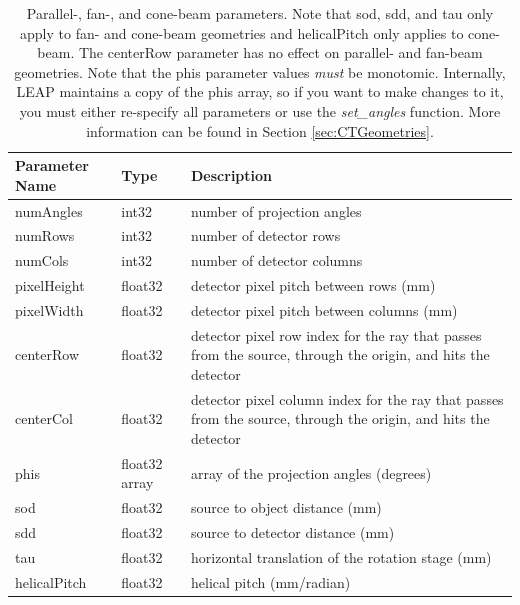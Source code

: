 \documentclass[11pt]{article}
\begin{document}
\begin{table}[h!]
\caption{Parallel-, fan-, and cone-beam parameters.  Note that sod, sdd, and tau only apply to fan- and cone-beam geometries and helicalPitch only applies to cone-beam. The centerRow parameter has no effect on parallel- and fan-beam geometries.  Note that the phis parameter values \textit{must} be monotomic.  Internally, LEAP maintains a copy of the phis array, so if you want to make changes to it, you must either re-specify all parameters or use the \textit{set\_angles} function.  More information can be found in Section \ref{sec:CTGeometries}.} \label{tab:stdGeometryParameters}
\begin{tabular}{l|l|p{9cm}}
Parameter Name & Type & Description \\
\hline
numAngles & int32 & number of projection angles \\
numRows & int32 & number of detector rows \\
numCols & int32 & number of detector columns \\
pixelHeight & float32 & detector pixel pitch between rows (mm) \\
pixelWidth & float32 & detector pixel pitch between columns (mm) \\
centerRow & float32 & detector pixel row index for the ray that passes from the source, through the origin, and hits the detector \\
centerCol & float32 & detector pixel column index for the ray that passes from the source, through the origin, and hits the detector \\
phis & float32 array & array of the projection angles (degrees) \\
sod & float32 & source to object distance (mm) \\
sdd & float32 & source to detector distance (mm) \\
tau & float32 & horizontal translation of the rotation stage (mm) \\
helicalPitch & float32 & helical pitch (mm/radian)
\end{tabular}
\end{table}
\end{document}
